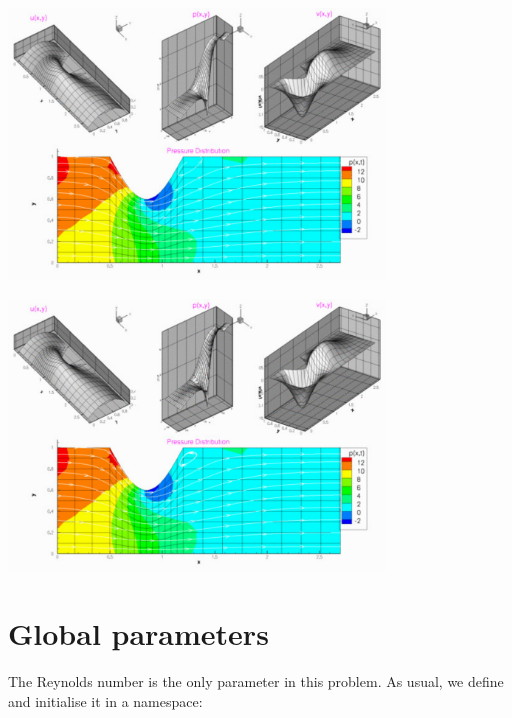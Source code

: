  
\begin{DoxyImage}
\includegraphics[width=0.75\textwidth]{TH}
\end{DoxyImage}
  
\begin{DoxyImage}
\includegraphics[width=0.75\textwidth]{CR}
\end{DoxyImage}




 

\hypertarget{index_namespace}{}\section{Global parameters}\label{index_namespace}
The Reynolds number is the only parameter in this problem. As usual, we define and initialise it in a namespace\+:

